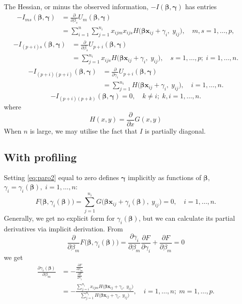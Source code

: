 \documentclass[a4paper,11pt]{article}
\newcommand{\bx}{\ensuremath{\mathbf{x}}}
\newcommand{\bb}{\ensuremath{\boldsymbol{\beta}}}
\newcommand{\bg}{\ensuremath{\boldsymbol{\gamma}}}
\newcommand{\Hy}{\ensuremath{H\big(\bb\bx_{ij} + \gamma_i, \;
    y_{ij}\big)}}
\newcommand{\pGy}{\ensuremath{G\big(\bb\bx_{ij} + \gamma_i(\bb), \;
    y_{ij}\big)}}
\newcommand{\dgdbm}{\ensuremath{\frac{\partial\gamma_i(\bb)}{\partial\beta_m}}}
\begin{document}
The Hessian, or minus the observed information, $-I(\bb, \bg)$ has entries
\begin{equation}\label{eq:hess1}
\begin{split}
-I_{ms}(\bb, \bg) &= \frac{\partial}{\partial\beta_s}U_m(\bb, \bg) \\
&= \sum_{i=1}^n\sum_{j=1}^{n_i} x_{ijm}x_{ijs} \Hy, \quad m, s = 1, \ldots, p,
\end{split}
\end{equation}
\begin{equation}\label{eq:hess12}
\begin{split}
-I_{(p+i)s}(\bb, \bg) &= \frac{\partial}{\partial\beta_s}U_{p+i}(\bb, \bg) \\
&= \sum_{j=1}^{n_i}x_{ijs} \Hy, \quad s = 1, \ldots, p;\; i =
1, \ldots, n.
\end{split}
\end{equation}
\begin{equation}\label{eq:hess2}
\begin{split}
-I_{(p+i)(p+i)}(\bb, \bg) &= \frac{\partial}{\partial\gamma_i}U_{p+i}(\bb,
\bg) \\ 
&= \sum_{j=1}^{n_i}\Hy, \quad i = 1, \ldots, n.
\end{split}
\end{equation}
\begin{equation*}
-I_{(p+i)(p+k)}(\bb, \bg) = 0, \quad k \ne i; \; k, i = 1, \ldots, n.
\end{equation*}
where
\begin{equation*}
H(x, y) = \frac{\partial}{\partial x} G(x, y)
\end{equation*}
When $n$ is large, we may utilise the fact that $I$ is partially diagonal.

\subsection{With profiling}
Setting \eqref{eq:paro2} equal to zero defines $\bg$ implicitly as
functions of $\bb$, $\gamma_i = \gamma_i(\bb), \; i = 1, \ldots, n$:
\begin{equation}\label{eq:impl}
F\big(\bb, \gamma_i(\bb)\big) = \sum_{j=1}^{n_i} \pGy = 0, \quad i = 1,
\ldots, n.
\end{equation}
Generally, we get no explicit form for $\gamma_i(\bb)$, but we can
calculate its partial derivatives via implicit derivation. From
\begin{equation*}
\frac{\partial}{\partial\beta_m}F\big(\bb, \gamma_i(\bb)\big) =
\frac{\partial\gamma_i}{\partial \beta_m} \frac{\partial F}{\partial
  \gamma_i} + \frac{\partial F}{\partial\beta_m} = 0
\end{equation*}
we get
\begin{equation}\label{eq:implscore}
\begin{split}
\dgdbm &= -\frac{\frac{\partial F}{\partial\beta_m}}
{\frac{\partial F}{\partial \gamma_i}} \\
&= -\frac{\sum_{j=i}^{n_i} x_{ijm} \Hy}{\sum_{j=1}^{n_i} \Hy}, \quad i = 1,
\ldots, n; \; m = 1, \ldots, p.  
\end{split}
\end{equation}
\end{document}

